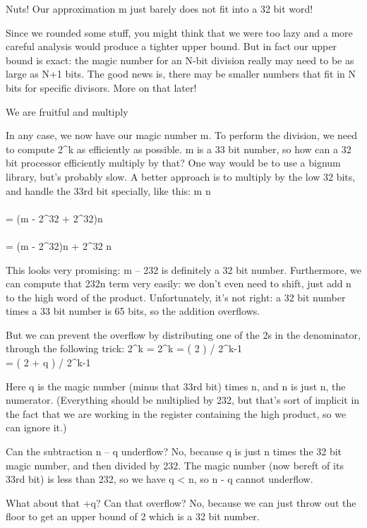 Nuts! Our approximation m just barely does not fit into a 32 bit word!

Since we rounded some stuff, you might think that we were too lazy and a more careful analysis would produce a tighter upper bound. But in fact our upper bound is exact: the magic number for an N-bit division really may need to be as large as N+1 bits. The good news is, there may be smaller numbers that fit in N bits for specific divisors. More on that later!
 
We are fruitful and multiply

In any case, we now have our magic number m. To perform the division, we need to compute \lfloor {} {2^k} \rfloor as efficiently as possible. m is a 33 bit number, so how can a 32 bit processor efficiently multiply by that? One way would be to use a bignum library, but’s probably slow. A better approach is to multiply by the low 32 bits, and handle the 33rd bit specially, like this:
m n \\ \\ = (m - 2^{32} + 2^{32})n \\ \\ = (m - 2^{32})n + 2^{32} n

This looks very promising: m – 232 is definitely a 32 bit number. Furthermore, we can compute that 232n term very easily: we don’t even need to shift, just add n to the high word of the product. Unfortunately, it’s not right: a 32 bit number times a 33 bit number is 65 bits, so the addition overflows.

But we can prevent the overflow by distributing one of the 2s in the denominator, through the following trick:
\lfloor {} {2^k} \rfloor = \lfloor {} {2^k} \rfloor = \lfloor (  2 ) / {2^{k-1}} \rfloor \\ = \lfloor ( \lfloor {} 2 \rfloor + q ) / {2^{k-1}} \rfloor

Here q is the magic number (minus that 33rd bit) times n, and n is just n, the numerator. (Everything should be multiplied by 232, but that’s sort of implicit in the fact that we are working in the register containing the high product, so we can ignore it.)

Can the subtraction n – q underflow? No, because q is just n times the 32 bit magic number, and then divided by 232. The magic number (now bereft of its 33rd bit) is less than 232, so we have q < n, so n - q cannot underflow.

What about that +q? Can that overflow? No, because we can just throw out the floor to get an upper bound of  2 which is a 32 bit number.

